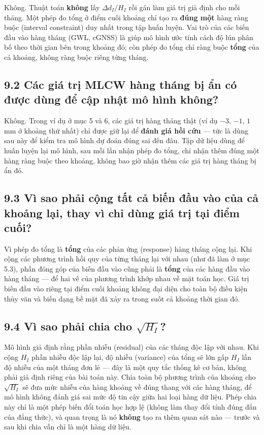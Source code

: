 \documentclass[12pt]{article}
\begin{document}
Không. Thuật toán \textbf{không} lấy $\Delta d_I/H_I$ rồi gán làm giá trị giả định cho mỗi tháng. Một phép đo tổng ở điểm cuối khoảng chỉ tạo ra \textbf{đúng một} hàng ràng buộc (interval constraint) duy nhất trong tập huấn luyện. Vai trò của các biến đầu vào hàng tháng (GWL, cGNSS) là giúp mô hình ước tính cách độ lún phân bố theo thời gian bên trong khoảng đó; còn phép đo tổng chỉ ràng buộc \textbf{tổng} của cả khoảng, không ràng buộc riêng từng tháng.

\subsection{9.2 Các giá trị MLCW hàng tháng bị ẩn có được dùng để cập nhật mô hình không?}

Không. Trong ví dụ ở mục 5 và 6, các giá trị hàng tháng thật (ví dụ $-3$, $-1$, $1$ mm ở khoảng thứ nhất) chỉ được giữ lại để \textbf{đánh giá hồi cứu} — tức là dùng sau này để kiểm tra mô hình dự đoán đúng sai đến đâu. Tập dữ liệu dùng để huấn luyện lại mô hình, sau mỗi lần nhận phép đo tổng, chỉ nhận thêm đúng một hàng ràng buộc theo khoảng, không bao giờ nhận thêm các giá trị hàng tháng bị ẩn đó.

\subsection{9.3 Vì sao phải cộng tất cả biến đầu vào của cả khoảng lại, thay vì chỉ dùng giá trị tại điểm cuối?}

Vì phép đo tổng là \textbf{tổng} của các phản ứng (response) hàng tháng cộng lại. Khi cộng các phương trình hồi quy của từng tháng lại với nhau (như đã làm ở mục 5.3), phần đóng góp của biến đầu vào cũng phải là \textbf{tổng} của các hàng đầu vào hàng tháng — để hai vế của phương trình khớp nhau về mặt toán học. Giá trị biến đầu vào riêng tại điểm cuối khoảng không đại diện cho toàn bộ điều kiện thủy văn và biến dạng bề mặt đã xảy ra trong suốt cả khoảng thời gian đó.

\subsection{9.4 Vì sao phải chia cho $\sqrt{H_I}$?}

Mô hình giả định rằng phần nhiễu (residual) của các tháng độc lập với nhau. Khi cộng $H_I$ phần nhiễu độc lập lại, độ nhiễu (variance) của tổng sẽ lớn gấp $H_I$ lần độ nhiễu của một tháng đơn lẻ — đây là một quy tắc thống kê cơ bản, không phải giả định riêng của bài toán này. Chia toàn bộ phương trình của khoảng cho $\sqrt{H_I}$ sẽ đưa mức nhiễu của hàng khoảng về đúng thang với các hàng tháng, để mô hình không đánh giá sai mức độ tin cậy giữa hai loại hàng dữ liệu. Phép chia này chỉ là một phép biến đổi toán học hợp lệ (không làm thay đổi tính đúng đắn của đẳng thức), và quan trọng là nó \textbf{không} tạo ra thêm quan sát nào — trước và sau khi chia vẫn chỉ là một hàng dữ liệu.
\end{document}
